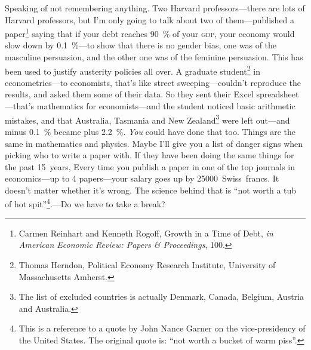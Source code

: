 \documentclass[10pt, a4paper, twoside]{lecturenotes}
\begin{document}
Speaking of not remembering anything. Two Harvard professors---there are lots of Harvard professors, but I'm only going to talk about two of them---published a paper\footnote{Carmen Reinhart and Kenneth Rogoff, Growth in a Time of Debt, \emph{in American Economic
Review: Papers \& Proceedings}, 100.} saying that if your debt reaches 90~\% of your \textsc{gdp}, your economy would slow down by 0.1~\%---to show that there is no gender bias, one was of the masculine persuasion, and the other one was of the feminine persuasion. This has been used to justify austerity policies all over. A graduate student\footnote{Thomas Herndon, Political Economy Research Institute, University of Massachusetts Amherst.} in econometrics---to economists, that's like street sweeping---couldn't reproduce the results, and asked them some of their data. So they sent their Excel spreadsheet---that's mathematics for economists---and the student noticed basic arithmetic mistakes, and that Australia, Tasmania and New Zealand\footnote{The list of excluded countries is actually Denmark, Canada, Belgium, Austria and Australia.} were left out---and minus 0.1~\% became plus 2.2~\%. \emph{You} could have done that too. Things are the same in mathematics and physics. Maybe I'll give you a list of danger signs when picking who to write a paper with. If they have been doing the same things for the past 15~years,   Every time you publish a paper in one of the top journals in economics---up to 4 papers---your salary goes up by 25000~Swiss~francs. It doesn't matter whether it's wrong. The science behind that is ``not worth a tub of hot spit''\footnote{This is a reference to a quote by John Nance Garner on the vice-presidency of the United States. The original quote is: ``not worth a bucket of warm piss''.}.---Do we have to take a break?
\end{document}
